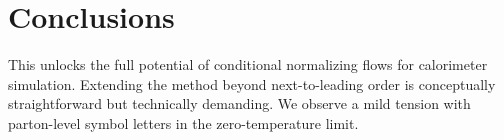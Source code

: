 \section{Conclusions}\label{sec:conclusions}

This unlocks the full potential of conditional normalizing flows for
calorimeter simulation. Extending the method beyond next-to-leading
order is conceptually straightforward but technically demanding. We
observe a mild tension with parton-level symbol letters in the
zero-temperature limit.

